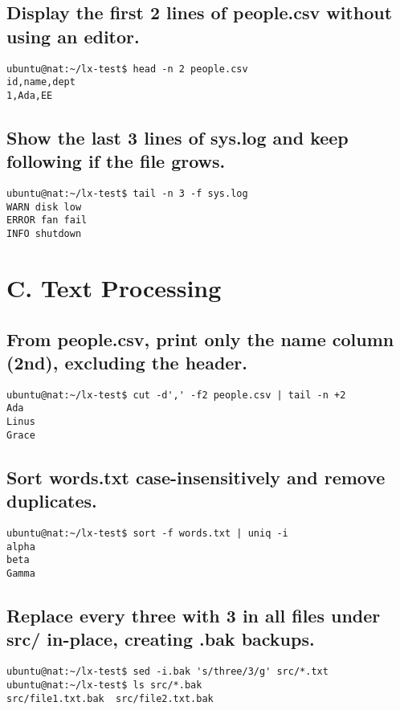 \subsection{Display the first 2 lines of people.csv without using an editor.}
\begin{verbatim}
ubuntu@nat:~/lx-test$ head -n 2 people.csv
id,name,dept
1,Ada,EE
\end{verbatim}

\subsection{Show the last 3 lines of sys.log and keep following if the file grows.}
\begin{verbatim}
ubuntu@nat:~/lx-test$ tail -n 3 -f sys.log
WARN disk low
ERROR fan fail
INFO shutdown
\end{verbatim}


\section{C. Text Processing}
\subsection{ From people.csv, print only the name column (2nd), excluding the header.}
\begin{verbatim}
ubuntu@nat:~/lx-test$ cut -d',' -f2 people.csv | tail -n +2
Ada
Linus
Grace
\end{verbatim}

\subsection{ Sort words.txt case-insensitively and remove duplicates.}
\begin{verbatim}
ubuntu@nat:~/lx-test$ sort -f words.txt | uniq -i
alpha
beta
Gamma
\end{verbatim}

\subsection{Replace every three with 3 in all files under src/ in-place, creating .bak backups.}
\begin{verbatim}
ubuntu@nat:~/lx-test$ sed -i.bak 's/three/3/g' src/*.txt
ubuntu@nat:~/lx-test$ ls src/*.bak
src/file1.txt.bak  src/file2.txt.bak
\end{verbatim}

